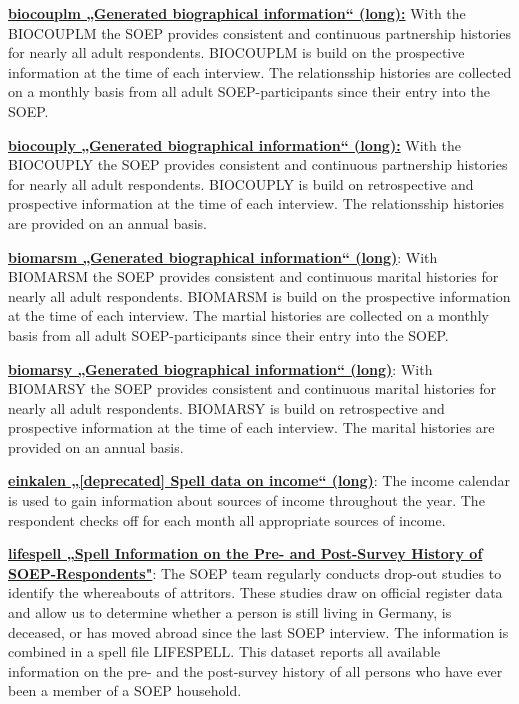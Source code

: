 \documentclass[letterpaper,10pt,openany,onesideH,english]{sphinxmanual}
\begin{document}
 \href{https://paneldata.org/soep-core/data/biocouplm}{\textbf{biocouplm „Generated biographical information“ (long):}} With the BIOCOUPLM the SOEP provides consistent and continuous partnership histories for nearly all adult respondents. BIOCOUPLM is build on the prospective information at the time of each interview. The relationsship histories are collected on a monthly basis from all adult SOEP-participants since their entry into the SOEP.

 \href{https://paneldata.org/soep-core/data/biocouply}{\textbf{biocouply „Generated biographical information“ (long):}} With the BIOCOUPLY the SOEP provides consistent and continuous partnership histories for nearly all adult respondents. BIOCOUPLY is build on retrospective and prospective information at the time of each interview. The relationsship histories are provided on an annual basis.

 \href{https://paneldata.org/soep-core/data/biomarsm}{\textbf{biomarsm „Generated biographical information“ (long)}}: With BIOMARSM the SOEP provides consistent and continuous marital histories for nearly all adult respondents. BIOMARSM is build on the prospective information at the time of each interview. The martial histories are collected on a monthly basis from all adult SOEP-participants since their entry into the SOEP.

 \href{https://paneldata.org/soep-core/data/biomarsy}{\textbf{biomarsy „Generated biographical information“ (long)}}: With BIOMARSY the SOEP provides consistent and continuous marital histories for nearly all adult respondents. BIOMARSY is build on retrospective and prospective information at the time of each interview. The marital histories are provided on an annual basis.

 \href{https://paneldata.org/soep-core/data/einkalen}{\textbf{einkalen „[deprecated] Spell data on income“ (long)}}: The income calendar is used to gain information about sources of income throughout the year. The respondent checks off for each month all appropriate sources of income.

 \href{https://paneldata.org/soep-core/data/lifespell}{\textbf{lifespell „Spell Information on the Pre- and Post-Survey History of SOEP-Respondents"}}: The SOEP team regularly conducts drop-out studies to identify the whereabouts of attritors. These studies draw on official register data and allow us to determine whether a person is still living in Germany, is deceased, or has moved abroad since the last SOEP interview. The information is combined in a spell file LIFESPELL. This dataset reports all available information on the pre- and the post-survey history of all persons who have ever been a member of a SOEP household.
\end{document}
